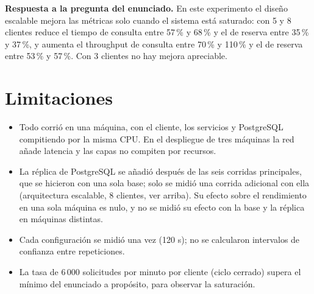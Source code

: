 \documentclass[10pt, a4paper]{article}
\begin{document}
\textbf{Respuesta a la pregunta del enunciado.} En este experimento el diseño escalable mejora las métricas solo cuando el sistema está saturado: con 5 y 8 clientes reduce el tiempo de consulta entre 57\,\% y 68\,\% y el de reserva entre 35\,\% y 37\,\%, y aumenta el throughput de consulta entre 70\,\% y 110\,\% y el de reserva entre 53\,\% y 57\,\%. Con 3 clientes no hay mejora apreciable.

\section{Limitaciones}
\begin{itemize}
	\item Todo corrió en una máquina, con el cliente, los servicios y PostgreSQL compitiendo por la misma CPU. En el despliegue de tres máquinas la red añade latencia y las capas no compiten por recursos.
	\item La réplica de PostgreSQL se añadió después de las seis corridas principales, que se hicieron con una sola base; solo se midió una corrida adicional con ella (arquitectura escalable, 8 clientes, ver arriba). Su efecto sobre el rendimiento en una sola máquina es nulo, y no se midió su efecto con la base y la réplica en máquinas distintas.
	\item Cada configuración se midió una vez (120 s); no se calcularon intervalos de confianza entre repeticiones.
	\item La tasa de 6\,000 solicitudes por minuto por cliente (ciclo cerrado) supera el mínimo del enunciado a propósito, para observar la saturación.
\end{itemize}
\end{document}
